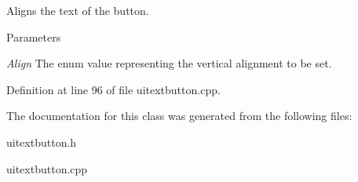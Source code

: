Aligns the text of the button. 


\begin{DoxyParams}{Parameters}
\item[{\em Align}]The enum value representing the vertical alignment to be set. \end{DoxyParams}


Definition at line 96 of file uitextbutton.cpp.



The documentation for this class was generated from the following files:\begin{DoxyCompactItemize}
\item 
uitextbutton.h\item 
uitextbutton.cpp\end{DoxyCompactItemize}
